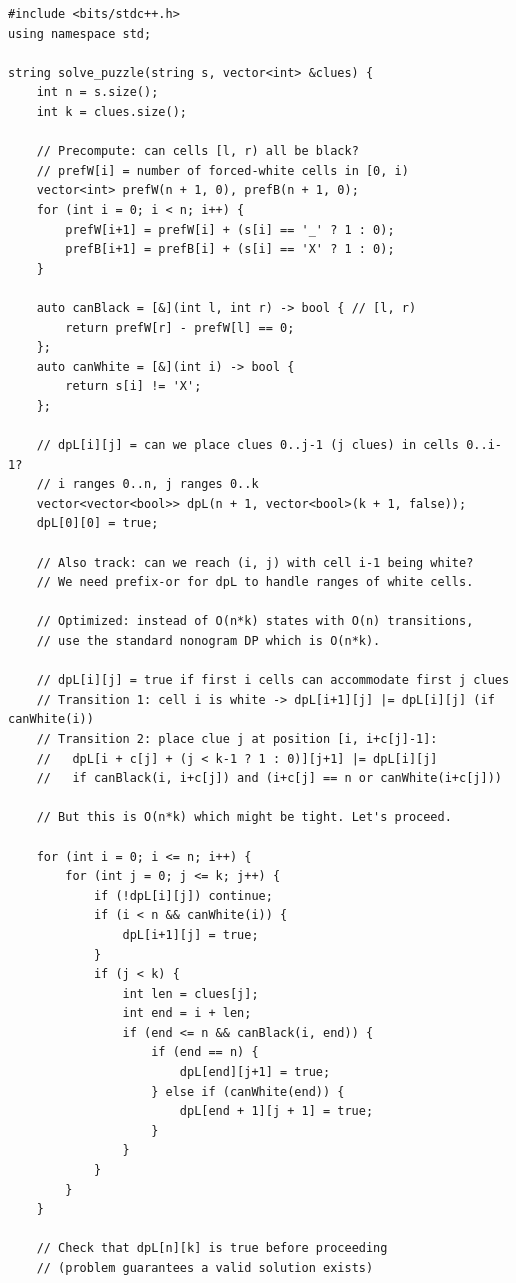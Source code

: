 \documentclass[11pt,a4paper]{article}
\begin{document}
\begin{lstlisting}
#include <bits/stdc++.h>
using namespace std;

string solve_puzzle(string s, vector<int> &clues) {
    int n = s.size();
    int k = clues.size();

    // Precompute: can cells [l, r) all be black?
    // prefW[i] = number of forced-white cells in [0, i)
    vector<int> prefW(n + 1, 0), prefB(n + 1, 0);
    for (int i = 0; i < n; i++) {
        prefW[i+1] = prefW[i] + (s[i] == '_' ? 1 : 0);
        prefB[i+1] = prefB[i] + (s[i] == 'X' ? 1 : 0);
    }

    auto canBlack = [&](int l, int r) -> bool { // [l, r)
        return prefW[r] - prefW[l] == 0;
    };
    auto canWhite = [&](int i) -> bool {
        return s[i] != 'X';
    };

    // dpL[i][j] = can we place clues 0..j-1 (j clues) in cells 0..i-1?
    // i ranges 0..n, j ranges 0..k
    vector<vector<bool>> dpL(n + 1, vector<bool>(k + 1, false));
    dpL[0][0] = true;

    // Also track: can we reach (i, j) with cell i-1 being white?
    // We need prefix-or for dpL to handle ranges of white cells.

    // Optimized: instead of O(n*k) states with O(n) transitions,
    // use the standard nonogram DP which is O(n*k).

    // dpL[i][j] = true if first i cells can accommodate first j clues
    // Transition 1: cell i is white -> dpL[i+1][j] |= dpL[i][j] (if canWhite(i))
    // Transition 2: place clue j at position [i, i+c[j]-1]:
    //   dpL[i + c[j] + (j < k-1 ? 1 : 0)][j+1] |= dpL[i][j]
    //   if canBlack(i, i+c[j]) and (i+c[j] == n or canWhite(i+c[j]))

    // But this is O(n*k) which might be tight. Let's proceed.

    for (int i = 0; i <= n; i++) {
        for (int j = 0; j <= k; j++) {
            if (!dpL[i][j]) continue;
            if (i < n && canWhite(i)) {
                dpL[i+1][j] = true;
            }
            if (j < k) {
                int len = clues[j];
                int end = i + len;
                if (end <= n && canBlack(i, end)) {
                    if (end == n) {
                        dpL[end][j+1] = true;
                    } else if (canWhite(end)) {
                        dpL[end + 1][j + 1] = true;
                    }
                }
            }
        }
    }

    // Check that dpL[n][k] is true before proceeding
    // (problem guarantees a valid solution exists)


\end{lstlisting}
\end{document}
